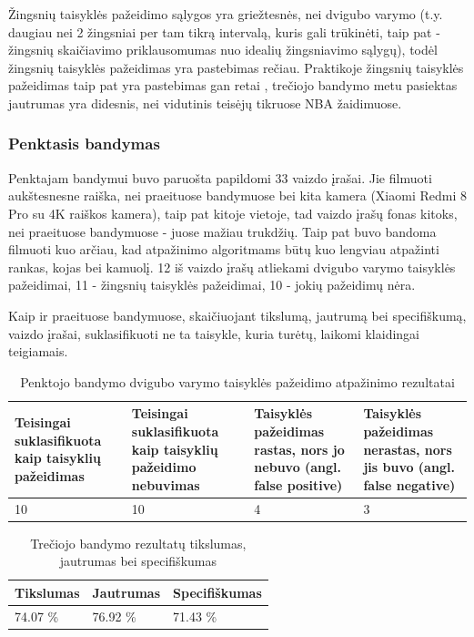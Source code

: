 \documentclass{VUMIFPSbakalaurinis}
\begin{document}
Žingsnių taisyklės pažeidimo sąlygos yra griežtesnės, nei dvigubo varymo (t.y. daugiau nei 2 žingsniai per tam tikrą intervalą, kuris gali trūkinėti, taip pat - žingsnių skaičiavimo priklausomumas nuo idealių žingsniavimo sąlygų), todėl žingsnių taisyklės pažeidimas yra pastebimas rečiau. Praktikoje žingsnių taisyklės pažeidimas taip pat yra pastebimas gan retai \cite{SiglerK}, trečiojo bandymo metu pasiektas jautrumas yra didesnis, nei vidutinis teisėjų tikruose NBA žaidimuose. 

\subsubsection{Penktasis bandymas}

Penktajam bandymui buvo paruošta papildomi 33 vaizdo įrašai. Jie filmuoti aukštesnesne raiška, nei praeituose bandymuose bei kita kamera (Xiaomi Redmi 8 Pro su 4K raiškos kamera), taip pat kitoje vietoje, tad vaizdo įrašų fonas kitoks, nei praeituose bandymuose - juose mažiau trukdžių. Taip pat buvo bandoma filmuoti kuo arčiau, kad atpažinimo algoritmams būtų kuo lengviau atpažinti rankas, kojas bei kamuolį. 12 iš vaizdo įrašų atliekami dvigubo varymo taisyklės pažeidimai, 11 - žingsnių taisyklės pažeidimai, 10 - jokių pažeidimų nėra. 

Kaip ir praeituose bandymuose, skaičiuojant tikslumą, jautrumą bei specifiškumą, vaizdo įrašai, suklasifikuoti ne ta taisykle, kuria turėtų, laikomi klaidingai teigiamais. 

\begin{table}[H]\footnotesize
	\centering
	\caption{Penktojo bandymo dvigubo varymo taisyklės pažeidimo atpažinimo rezultatai}
	{\begin{tabular}{|p{3cm}|p{3cm}|p{3cm}|p{2cm}|} \hline
			\textbf{Teisingai suklasifikuota kaip taisyklių pažeidimas} & \textbf{Teisingai suklasifikuota kaip taisyklių pažeidimo nebuvimas} & \textbf{Taisyklės pažeidimas rastas, nors jo nebuvo (angl. false positive)} & \textbf{Taisyklės pažeidimas nerastas, nors jis buvo (angl. false negative)} \\
			\hline
			10  & 10    & 4    & 3   \\
			\hline
	\end{tabular}}
	\label{tab:fifth_trial}
\end{table}

\begin{table}[H]\footnotesize
	\centering
	\caption{Trečiojo bandymo rezultatų tikslumas, jautrumas bei specifiškumas}
	{\begin{tabular}{|p{5cm}|p{5cm}|p{5cm}|} \hline
			\textbf{Tikslumas} & \textbf{Jautrumas} & \textbf{Specifiškumas} \\
			\hline
			74.07 \%  & 76.92 \%    & 71.43 \%    \\
			
			\hline
	\end{tabular}}
	\label{tab:fifth_trial_percents}
\end{table}
\end{document}
